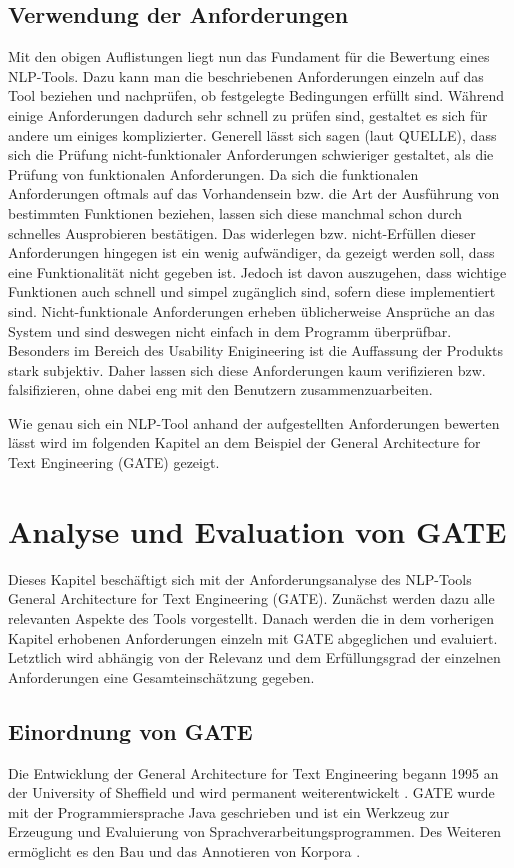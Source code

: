 \documentclass[12pt]{report}
\begin{document}
\section{Verwendung der Anforderungen}
Mit den obigen Auflistungen liegt nun das Fundament für die Bewertung eines NLP-Tools. Dazu kann man die beschriebenen Anforderungen einzeln auf das Tool beziehen und nachprüfen, ob festgelegte Bedingungen erfüllt sind. Während einige Anforderungen dadurch sehr schnell zu prüfen sind, gestaltet es sich für andere um einiges komplizierter. Generell lässt sich sagen (laut QUELLE), dass sich die Prüfung nicht-funktionaler Anforderungen schwieriger gestaltet, als die Prüfung von funktionalen Anforderungen. Da sich die funktionalen Anforderungen oftmals auf das Vorhandensein bzw. die Art der Ausführung von bestimmten Funktionen beziehen, lassen sich diese manchmal schon durch schnelles Ausprobieren bestätigen. Das widerlegen bzw. nicht-Erfüllen dieser Anforderungen hingegen ist ein wenig aufwändiger, da gezeigt werden soll, dass eine Funktionalität nicht gegeben ist. Jedoch ist davon auszugehen, dass wichtige Funktionen auch schnell und simpel zugänglich sind, sofern diese implementiert sind. 
Nicht-funktionale Anforderungen erheben üblicherweise Ansprüche an das System und sind deswegen nicht einfach in dem Programm überprüfbar. Besonders im Bereich des Usability Enigineering ist die Auffassung der Produkts stark subjektiv. Daher lassen sich diese Anforderungen kaum verifizieren bzw. falsifizieren, ohne dabei eng mit den Benutzern zusammenzuarbeiten. 

Wie genau sich ein NLP-Tool anhand der aufgestellten Anforderungen bewerten lässt wird im folgenden Kapitel an dem Beispiel der General Architecture for Text Engineering (GATE) gezeigt. 

\chapter{Analyse und Evaluation von GATE}
Dieses Kapitel beschäftigt sich mit der Anforderungsanalyse des NLP-Tools General Architecture for Text Engineering (GATE). Zunächst werden dazu alle relevanten Aspekte des Tools vorgestellt. Danach werden die in dem vorherigen Kapitel erhobenen Anforderungen einzeln mit GATE abgeglichen und evaluiert. Letztlich wird abhängig von der Relevanz und dem Erfüllungsgrad der einzelnen Anforderungen eine Gesamteinschätzung gegeben.

\section{Einordnung von GATE}
Die Entwicklung der General Architecture for Text Engineering begann 1995 an der University of Sheffield und wird permanent weiterentwickelt \cite{cgw95}. GATE wurde mit der Programmiersprache Java geschrieben  und ist ein Werkzeug zur Erzeugung und Evaluierung von Sprachverarbeitungsprogrammen. Des Weiteren ermöglicht es den Bau und das Annotieren von Korpora \cite{cmb02}. 
\end{document}
